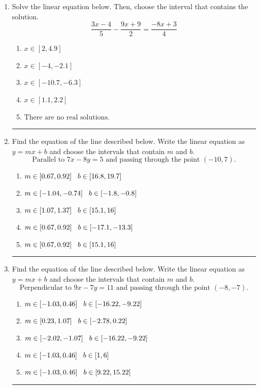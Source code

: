 \documentclass[14pt]{extbook}
\newcommand{\litem}[1]{\item#1\hspace*{-1cm}\rule{\textwidth}{0.4pt}}
\begin{document}
\begin{enumerate}
\litem{
Solve the linear equation below. Then, choose the interval that contains the solution.\[ \frac{3x -4}{5} - \frac{9x + 9}{2} = \frac{-8x + 3}{4} \]\begin{enumerate}[label=\Alph*.]
\item \( x \in [2, 4.9] \)
\item \( x \in [-4, -2.1] \)
\item \( x \in [-10.7, -6.3] \)
\item \( x \in [1.1, 2.2] \)
\item \( \text{There are no real solutions.} \)

\end{enumerate} }
\litem{
Find the equation of the line described below. Write the linear equation as $ y=mx+b $ and choose the intervals that contain $m$ and $b$.\[ \text{Parallel to } 7 x - 8 y = 5 \text{ and passing through the point } (-10, 7). \]\begin{enumerate}[label=\Alph*.]
\item \( m \in [0.67, 0.92] \hspace*{3mm} b \in [16.8, 19.7] \)
\item \( m \in [-1.04, -0.74] \hspace*{3mm} b \in [-1.8, -0.8] \)
\item \( m \in [1.07, 1.37] \hspace*{3mm} b \in [15.1, 16] \)
\item \( m \in [0.67, 0.92] \hspace*{3mm} b \in [-17.1, -13.3] \)
\item \( m \in [0.67, 0.92] \hspace*{3mm} b \in [15.1, 16] \)

\end{enumerate} }
\litem{
Find the equation of the line described below. Write the linear equation as $ y=mx+b $ and choose the intervals that contain $m$ and $b$.\[ \text{Perpendicular to } 9 x - 7 y = 11 \text{ and passing through the point } (-8, -7). \]\begin{enumerate}[label=\Alph*.]
\item \( m \in [-1.03, 0.46] \hspace*{3mm} b \in [-16.22, -9.22] \)
\item \( m \in [0.23, 1.07] \hspace*{3mm} b \in [-2.78, 0.22] \)
\item \( m \in [-2.02, -1.07] \hspace*{3mm} b \in [-16.22, -9.22] \)
\item \( m \in [-1.03, 0.46] \hspace*{3mm} b \in [1, 6] \)
\item \( m \in [-1.03, 0.46] \hspace*{3mm} b \in [9.22, 15.22] \)


\end{enumerate}}
\end{enumerate}
\end{document}
